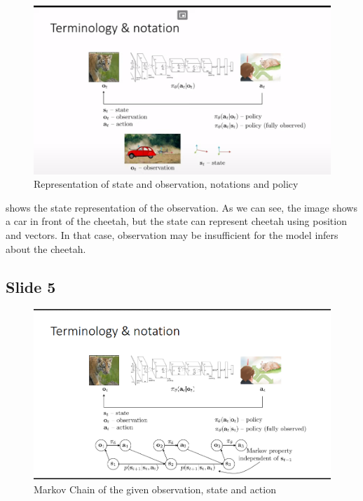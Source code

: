 \documentclass[]{article}
\begin{document}
\begin{figure}
\begin{center}
    \includegraphics[scale=0.4]{cap2img/slide4.png}
\end{center}
\caption{Representation of state and observation, notations and policy}
\label{fig:cheetah}
\end{figure}

 shows the state representation of the observation. As we can see, the image shows a car in front
of the cheetah, but the state can represent cheetah using position and vectors. In that case, observation may be
insufficient for the model infers about the cheetah.


\subsection*{Slide 5}%
\label{sub:Slide 5}

\begin{figure}
\begin{center}
    \includegraphics[scale=0.4]{cap2img/slide5.png}
\end{center}
\caption{Markov Chain of the given observation, state and action}
\label{fig:markov}
\end{figure}
\end{document}
